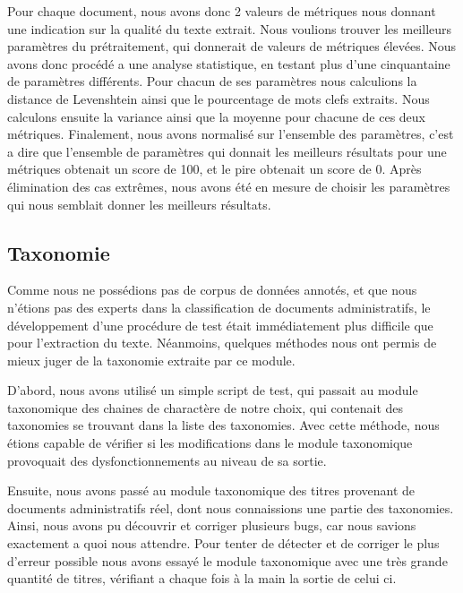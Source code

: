 Pour chaque document, nous avons donc 2 valeurs de métriques nous donnant une indication sur la qualité du texte extrait.
Nous voulions trouver les meilleurs paramètres du prétraitement, qui donnerait de valeurs de métriques élevées.
Nous avons donc procédé a une analyse statistique, en testant plus d'une cinquantaine de paramètres différents.
Pour chacun de ses paramètres nous calculions la distance de Levenshtein ainsi que le pourcentage de mots clefs extraits.
Nous calculons ensuite la variance ainsi que la moyenne pour chacune de ces deux métriques.
Finalement, nous avons normalisé sur l'ensemble des paramètres, c'est a dire que l'ensemble de paramètres qui donnait les meilleurs résultats pour une métriques obtenait un score de 100, et le pire obtenait un score de 0.
Après élimination des cas extrêmes, nous avons été en mesure de choisir les paramètres qui nous semblait donner les meilleurs résultats.
\subsection{Taxonomie}
Comme nous ne possédions pas de corpus de données annotés, et que nous n'étions pas des experts dans la classification de documents administratifs, le développement d'une procédure de test était immédiatement plus difficile que pour l'extraction du texte.
Néanmoins, quelques méthodes nous ont permis de mieux juger de la taxonomie extraite par ce module. 

D'abord, nous avons utilisé un simple script de test, qui passait au module taxonomique des chaines de charactère de notre choix, qui contenait des taxonomies se trouvant dans la liste des taxonomies.
Avec cette méthode, nous étions capable de vérifier si les modifications dans le module taxonomique provoquait des dysfonctionnements au niveau de sa sortie. 

Ensuite, nous avons passé au module taxonomique des titres provenant de documents administratifs réel, dont nous connaissions une partie des taxonomies.
Ainsi, nous avons pu découvrir et corriger plusieurs bugs, car nous savions exactement a quoi nous attendre.
Pour tenter de détecter et de corriger le plus d'erreur possible nous avons essayé le module taxonomique avec une très grande quantité de titres, vérifiant a chaque fois à la main la sortie de celui ci. 





